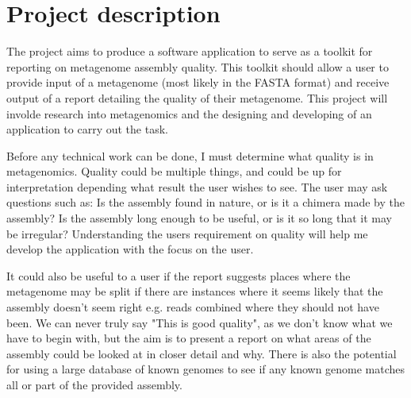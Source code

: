 \documentclass[11pt,fleqn,twoside]{article}
\begin{document}
\wordcount{}

\mmp

\setcounter{tocdepth}{3} %

\section{Project description}
The project aims to produce a software application to serve as a toolkit for reporting on metagenome assembly quality. This toolkit should allow a user to provide input of a metagenome\cite{metagenome} (most likely in the FASTA format\cite{fasta}) and receive output of a report detailing the quality of their metagenome. This project will involde research into metagenomics and the designing and developing of an application to carry out the task.

Before any technical work can be done, I must determine what quality is in metagenomics. Quality could be multiple things, and could be up for interpretation depending what result the user wishes to see. The user may ask questions such as: Is the assembly found in nature, or is it  a chimera made by the assembly? Is the assembly long enough to be useful, or is it so long that it may be irregular? Understanding the users requirement on quality will help me develop the application with the focus on the user.

It could also be useful to a user if the report suggests places where the metagenome may be split if there are instances where it seems likely that the assembly doesn't seem right e.g. reads combined where they should not have been. We can never truly say "This is good quality", as we don't know what we have to begin with, but the aim is to present a report on what areas of the assembly could be looked at in closer detail and why. There is also the potential for using a large database of known genomes to see if any known genome matches all or part of the provided assembly.
\end{document}

